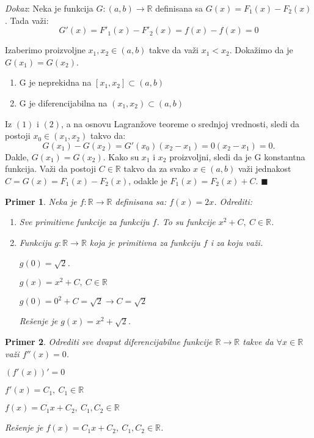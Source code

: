 \documentclass{article}
\newtheorem{prim}{Primer}[section]
\begin{document}
\textit{Dokaz}: Neka je funkcija $G: (a, b) \longrightarrow \mathbb{R}$
definisana sa $G(x) = F_1(x) - F_2(x)$. Tada važi:
\begin{equation*}
    G'(x) = F'_1(x) - F'_2(x) = f(x) - f(x) = 0
\end{equation*}

Izaberimo proizvoljne $x_1, x_2 \in (a, b)$ takve da važi
$x_1 < x_2$. Dokažimo da je $G(x_1) = G(x_2)$.
\begin{enumerate}[label=(\arabic*)]
    \item G je neprekidna na $[x_1, x_2] \subset (a, b)$
    \item G je diferencijabilna na $(x_1, x_2) \subset (a, b)$
\end{enumerate}
Iz $(1)$ i $(2)$, a na osnovu Lagranžove teoreme o srednjoj vrednosti,
sledi da postoji $x_0 \in (x_1, x_2)$ takvo da:
$$G(x_1) - G(x_2) = G'(x_0)(x_2-x_1) = 0  (x_2-x_1) = 0.$$
Dakle, $G(x_1) = G(x_2)$. Kako su $x_1$ i $x_2$
proizvoljni, sledi da je G konstantna funkcija. Važi
da postoji $C\in\mathbb{R}$ takvo da za svako $x\in(a, b)$ važi
jednakost $C=G(x) =F_1(x) - F_2(x)$, odakle je $F_1(x) = F_2(x) + C$.
\null\hfill $\blacksquare$\par

\begin{primbox}
    \begin{prim}
        Neka je $f: \mathbb{R} \longrightarrow \mathbb{R}$
        definisana sa: $f(x) = 2x$. Odrediti:
        \begin{enumerate}[label=\alph*)]
            \item Sve primitivne funkcije za funkciju $f$.
                  To su funkcije $x^2 + C,\  C \in \mathbb{R}$.
            \item Funkciju $g: \mathbb{R} \longrightarrow \mathbb{R}$
                  koja je primitivna za funkciju $f$ i za koju važi.

                  $g(0) = \sqrt{2}$.\par
                  $g(x) = x^2 + C,\ C \in \mathbb{R}$\par
                  $g(0) = 0^2 + C = \sqrt{2} \longrightarrow C = \sqrt{2}$\par
                  Rešenje je $g(x) = x^2 + \sqrt{2}$.
        \end{enumerate}
    \end{prim}
\end{primbox}

\begin{primbox}
    \begin{prim}
        Odrediti sve dvaput diferencijabilne funkcije
        $\mathbb{R} \longrightarrow \mathbb{R}$ takve da
        $\forall x \in \mathbb{R}$ važi $f''(x) = 0$.\par
        $(f'(x))' = 0$\par
        $f'(x) = C_1,\  C_1 \in \mathbb{R}$ \par
        $f(x) = C_1x+C_2,\ C_1,C_2 \in \mathbb{R}$ \par
        Rešenje je $f(x) = C_1x + C_2,\ C_1, C_2 \in \mathbb{R}$.
    \end{prim}
\end{primbox}
\end{document}

